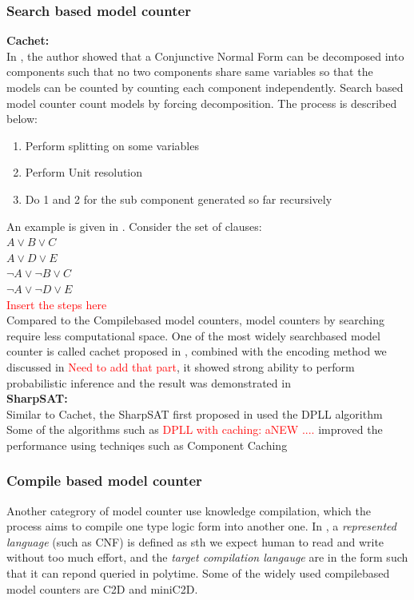     \subsubsection{Search based model counter}
    \textbf{Cachet:}\\
    In \cite{Bayardo:2000:CMU:647288.721114}, the author showed that a Conjunctive Normal Form can be decomposed into components such that no two components share same variables
    so that the models can be counted by counting each component independently.
    Search based model counter count models by forcing decomposition. The process is described below:
    \begin{enumerate}
        \item Perform splitting on some variables
        \item Perform Unit resolution
        \item Do 1 and 2 for the sub component generated so far recursively 
    \end{enumerate}
    An example is given in \cite{2008-literature-review}. Consider the set of clauses:\\
    $A \vee B \vee C$\\
    $A \vee D \vee E$\\
    $\neg A \vee \neg B \vee C$\\
    $\neg A \vee \neg D \vee E$\\
    \textcolor{red}{Insert the steps here}\\
    Compared to the Compile\-based model counters, model counters by searching require less computational space. One of the most widely search\-based model counter is called cachet proposed in \cite{Cachet}, combined with the encoding method we discussed in \textcolor{red}{Need to add that part}, it showed strong ability to perform probabilistic inference and the result was demonstrated in \cite{Sang:2005:PBI:1619332.1619409}\\
    \textbf{SharpSAT:}\\
    Similar to Cachet, the SharpSAT first proposed in \cite{Sharp-SAT2006} used the DPLL algorithm \\
    Some of the algorithms such as \textcolor{red}{DPLL with caching: aNEW ....} improved the performance using techniqes such as Component Caching
    \subsubsection{Compile based model counter}
    Another categrory of model counter use knowledge compilation, which the process aims to compile one type logic form into another one.\cite{2008-literature-review} In \cite{2002language-map}, a \textit{represented language} (such as CNF) is defined as sth we expect human to read and write without too much effort, and the \textit{target compilation langauge} are in the form such that it can repond queried in poly\-time. Some of the widely used compile\-based model counters are C2D and miniC2D.\\
    
